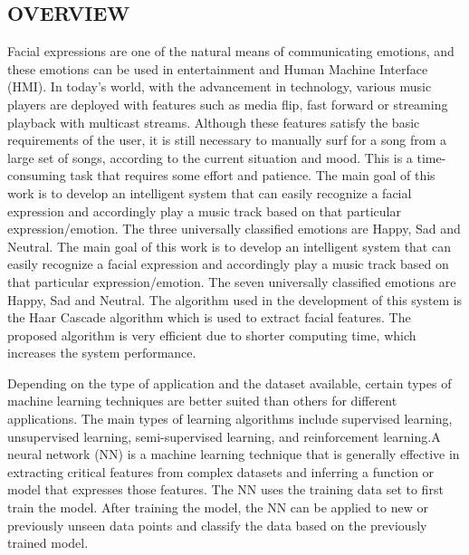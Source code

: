 \documentclass[12pt]{report}
\begin{document}
\subsection{OVERVIEW}

\justifying
\setlength{\parindent}{4em}
\setlength{\parskip}{0.5em}
\renewcommand{\baselinestretch}{1.5}

\normalsize
\hspace{1.7cm}
Facial expressions are one of the natural means of communicating emotions, and 
these emotions can be used in entertainment and Human Machine Interface (HMI). In 
today's world, with the advancement in technology, various music players are deployed with 
features such as media flip, fast forward or streaming playback with multicast streams. 
Although these features satisfy the basic requirements of the user, it is still necessary to 
manually surf for a song from a large set of songs, according to the current situation and 
mood. This is a time-consuming task that requires some effort and patience. The main goal 
of this work is to develop an intelligent system that can easily recognize a facial expression 
and accordingly play a music track based on that particular expression/emotion. The three 
universally classified emotions are Happy, Sad and Neutral. The main goal of this work is 
to develop an intelligent system that can easily recognize a facial expression and 
accordingly play a music track based on that particular expression/emotion. The seven 
universally classified emotions are Happy, Sad and Neutral. The algorithm used in the 
development of this system is the Haar Cascade algorithm which is used to extract facial 
features. The proposed algorithm is very efficient due to shorter computing time, which 
increases the system performance.


Depending on the type of 
application and the dataset available, certain types of machine learning techniques are better
suited than others for different applications. The main types of learning algorithms include 
supervised learning, unsupervised learning, semi-supervised learning, and reinforcement 
learning.A neural network (NN) is a machine learning technique that is generally effective 
in extracting critical features from complex datasets and inferring a function or model that 
expresses those features. The NN uses the training data set to first train the model. After 
training the model, the NN can be applied to new or previously unseen data points and 
classify the data based on the previously trained model.
\end{document}
